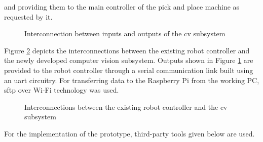 \documentclass[a4paper,12pt]{report}
\begin{document}
and providing them to the main controller of the pick and place machine as requested by it.\\ 

\begin{figure}[h]
	\centering
	
	\caption{Interconnection between inputs and outputs of the \ac{cv} subsystem}
	\label{fig:ioprocess}
\end{figure}



Figure \ref{fig:cvsubsys} depicts the interconnections between the existing robot controller and the newly developed computer vision subsystem. Outputs shown in Figure \ref{fig:ioprocess} are provided to the robot controller through a serial communication link built using an \ac{uart} circuitry. For transferring data to the Raspberry Pi from the working PC, \ac{sftp} over Wi-Fi technology was used.

\begin{figure}[h]
	\centering
	
	\caption{Interconnections between the existing robot controller and the \ac{cv} subsystem}
	\label{fig:cvsubsys}
\end{figure}

For the implementation of the prototype, third-party tools given below are used.\\
\end{document}
